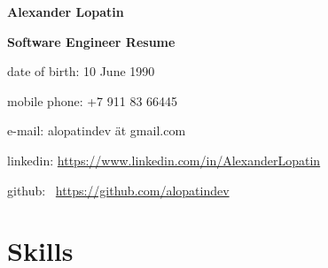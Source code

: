 \begin{center}
\fontsize{12pt}{10pt}\selectfont
\bfseries Alexander Lopatin\mdseries

\fontsize{10pt}{10pt}\selectfont
\bfseries Software Engineer\mdseries
\linebreak
Resume
\end{center}
{
\fontsize{9pt}{8pt}\selectfont
\begin{center}
\item date of birth: 10 June 1990
\item mobile phone: +7 911 83 66445
\item e-mail: alopatindev ät gmail.com
\item linkedin: \href{https://www.linkedin.com/in/AlexanderLopatin}{https://www.linkedin.com/in/AlexanderLopatin}
\item github: \
\href{https://github.com/alopatindev?tab=repositories}{https://github.com/alopatindev}
\end{center}
}


\fontsize{11pt}{12pt}\selectfont

\section{Skills}

